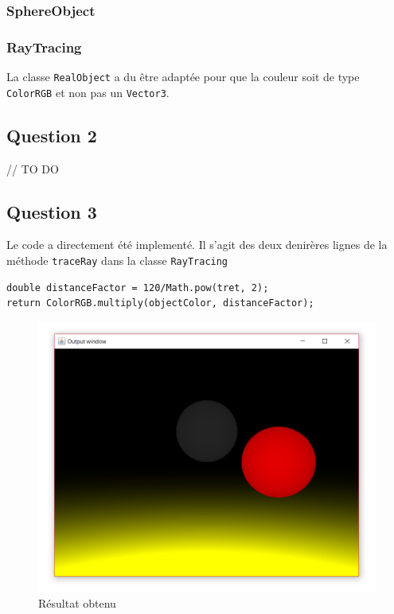 \subsubsection{SphereObject}

\subsubsection{RayTracing}

La classe \texttt{RealObject} a du être adaptée pour que la couleur soit de type \texttt{ColorRGB} et non pas un \texttt{Vector3}.



\subsection{Question 2}

// TO DO

\subsection{Question 3}

Le code a directement été implementé. Il s'agit des deux denirères lignes de la méthode \texttt{traceRay} dans la classe \texttt{RayTracing}

\begin{lstlisting}
double distanceFactor = 120/Math.pow(tret, 2);
return ColorRGB.multiply(objectColor, distanceFactor);
\end{lstlisting}

\begin{figure}[H]
	\caption{\label{9_resultat} Résultat obtenu}
	\centering
	\includegraphics[scale = 0.4]{9_resultat.png}
\end{figure}